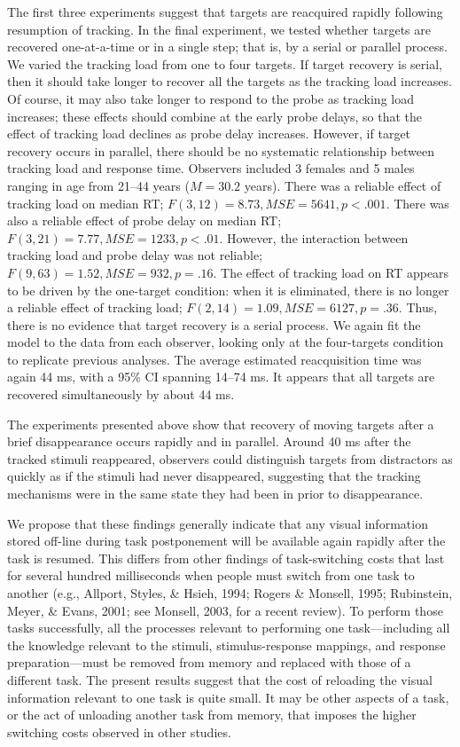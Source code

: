\documentclass[doc]{apa}
\newcommand{\MSE}{\ensuremath{\mathit{MSE}}}
\begin{document}
The first three experiments suggest that targets are reacquired rapidly
following resumption of tracking.  In the final experiment, we tested
whether targets are recovered one-at-a-time or in a single step; that is,
by a serial or parallel process.  We varied the tracking load from one to
four targets.  If target recovery is serial, then it should take longer to
recover all the targets as the tracking load increases.  Of course, it may
also take longer to respond to the probe as tracking load increases; these
effects should combine at the early probe delays, so that the effect of
tracking load declines as probe delay increases. However, if target
recovery occurs in parallel, there should be no systematic relationship
between tracking load and response time.  Observers included 3 females and
5 males ranging in age from 21--44 years ($M = 30.2$ years).  There was a
reliable effect of tracking load on median RT; $F(3, 12) = 8.73, \MSE =
5641, p < .001$.  There was also a reliable effect of probe delay on median
RT; $F(3, 21) = 7.77, \MSE = 1233, p < .01$.  However, the interaction
between tracking load and probe delay was not reliable; $F(9, 63) = 1.52,
\MSE = 932, p = .16$.  The effect of tracking load on RT appears to be
driven by the one-target condition: when it is eliminated, there is no
longer a reliable effect of tracking load; $F(2, 14) = 1.09, \MSE = 6127, p
= .36$.  Thus, there is no evidence that target recovery is a serial
process.  We again fit the model to the data from each observer, looking
only at the four-targets condition to replicate previous analyses.  The
average estimated reacquisition time was again 44 ms, with a 95\% CI
spanning 14--74 ms.  It appears that all targets are recovered
simultaneously by about 44 ms.

The experiments presented above show that recovery of moving targets after
a brief disappearance occurs rapidly and in parallel.  Around 40 ms after
the tracked stimuli reappeared, observers could distinguish targets from
distractors as quickly as if the stimuli had never disappeared, suggesting
that the tracking mechanisms were in the same state they had been in prior
to disappearance.

We propose that these findings generally indicate that any visual
information stored off-line during task postponement will be available
again rapidly after the task is resumed.  This differs from other findings
of task-switching costs that last for several hundred milliseconds when
people must switch from one task to another (e.g., Allport, Styles, \&
Hsieh, 1994; Rogers \& Monsell, 1995; Rubinstein, Meyer, \& Evans, 2001;
see Monsell, 2003, for a recent review).  To perform those tasks
successfully, all the processes relevant to performing one task---including
all the knowledge relevant to the stimuli, stimulus-response mappings, and
response preparation---must be removed from memory and replaced with those
of a different task.  The present results suggest that the cost of
reloading the visual information relevant to one task is quite small.  It
may be other aspects of a task, or the act of unloading another task from
memory, that imposes the higher switching costs observed in other studies.
\end{document}

